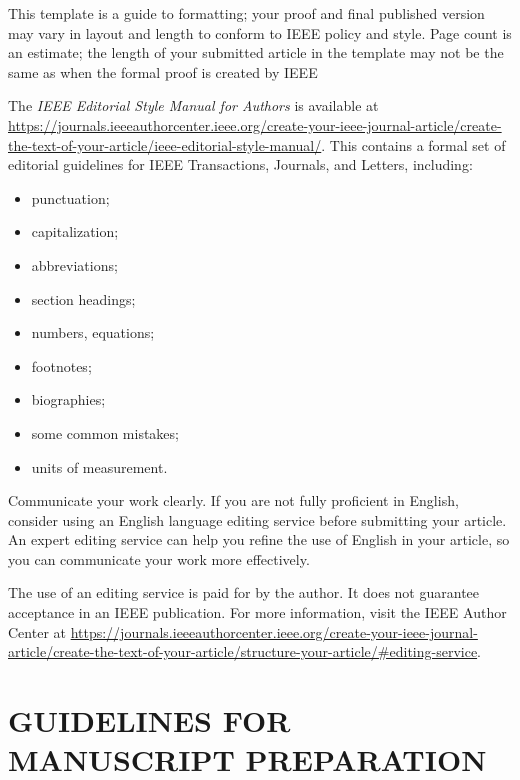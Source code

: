 \documentclass[letter]{IEEEtaes}
\begin{document}
This template is a guide to formatting; your proof and final published version may vary in layout and length to conform to IEEE policy and style. Page count is an estimate; the length of your submitted article in the template may not be the same as when the formal proof is created by IEEE

The {\it IEEE Editorial Style Manual for Authors} is available at \href{https://journals.ieeeauthorcenter.ieee.org/create-your-ieee-journal-article/create-the-text-of-your-article/ieee-editorial-style-manual/}{https://journals.ieeeauthorcenter.ieee.org/create-your-ieee-journal-article/create-the-text-of-your-article/ieee-editorial-style-manual/}. This contains a formal set of editorial guidelines for IEEE Transactions, Journals, and Letters, including:
\begin{itemize}
\item punctuation;
\item capitalization;
\item abbreviations;
\item section headings;
\item numbers, equations;
\item footnotes;
\item biographies;
\item some common mistakes;
\item units of measurement.
\end{itemize}

Communicate your work clearly. If you are not fully proficient in English, consider using an English language editing service before submitting your article. An expert editing service can help you refine the use of English in your article, so you can communicate your work more effectively.

The use of an editing service is paid for by the author. It does not guarantee acceptance in an IEEE publication. For more information, visit the IEEE Author Center at \href{https://journals.ieeeauthorcenter.ieee.org/create-your-ieee-journal-article/create-the-text-of-your-article/structure-your-article/\#editing-service}{https://journals.ieeeauthorcenter.ieee.org/create-your-ieee-journal-article/create-the-text-of-your-article/structure-your-article/\#editing-service}.

\section{GUIDELINES FOR MANUSCRIPT PREPARATION}
\end{document}
